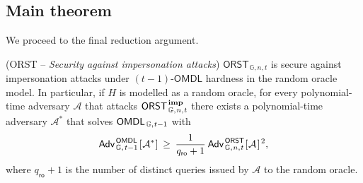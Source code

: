 \documentclass{iacrtrans}
\begin{document}
\subsection{Main theorem}\label{section_main_theorem}

\noindent
We proceed to the final reduction argument.

\begin{thm}\label{theorem_orst_security}
\textup{(\textsf{ORST} --
\textit{Security against impersonation attacks})}
$\mathsf{ORST}_{\hspace{1pt}\mathbb{G}, n, t}$
is secure against impersonation attacks
under $(t-1)$-$\mathsf{OMDL}$ hardness
in the random oracle model.
In particular, if $H$ is modelled as a random oracle,
for every polynomial-time adversary $\mathcal{A}$ that attacks
$\mathsf{ORST}
	_{\hspace{1pt}\mathbb{G},\hspace{0.5pt} n,\hspace{0.5pt} t}
	^\mathbf{\hspace{1pt}imp}
$
there exists a polynomial-time
adversary $\mathcal{A}^*$ that solves
$\mathsf{OMDL}
	_{\hspace{1pt}\mathbb{G},\hspace{0.5pt} t-1}
$
with
\vspace{5pt}
\begin{equation}\label{orst_security_bound}
	\mathsf{Adv}
		_{\hspace{1pt}\mathbb{G},\hspace{1pt} t-1}
		^{\hspace{1pt}\mathsf{OMDL}}
		\hspace{1pt}
		[
			\hspace{0.5pt}
			\mathcal{A}^*
			\hspace{0.5pt}
		]
	\hspace{2pt}
	\ge
	\hspace{2pt}
	\frac{1}{q_{\mathsf{ro}} + 1}
	\hspace{2pt}
	\mathsf{Adv}
		_{\hspace{1pt}\mathbb{G}, \hspace{0.5pt}n, \hspace{0.5pt}t}
		^{\hspace{1pt}\mathsf{ORST}}
		\hspace{0.5pt}
		[
			\hspace{0.5pt}
			\mathcal{A}
			\hspace{1pt}
		] ^ {\hspace{1pt}2},
\vspace{5pt}
\end{equation}
where $q_\mathsf{ro} + 1$ is the number of distinct queries
issued by $\mathcal{A}$ to the random oracle.
\end{thm}
\end{document}
